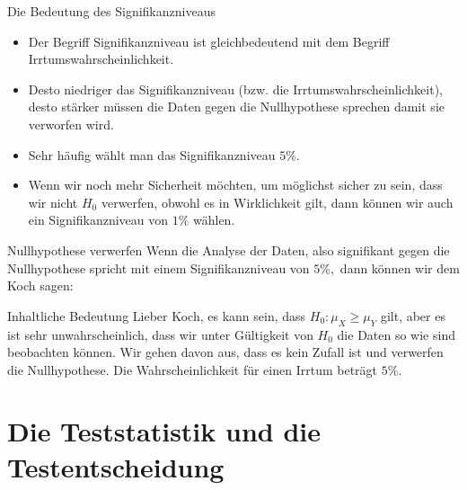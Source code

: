 \documentclass[usenames,dvipsnames,handout]{beamer}
\begin{document}

\begin{frame}{Die Bedeutung des Signifikanzniveaus}
\begin{itemize}
\item{Der Begriff Signifikanzniveau ist gleichbedeutend mit dem Begriff Irrtumswahrscheinlichkeit.}\pause
\item{Desto niedriger das Signifikanzniveau (bzw. die Irrtumswahrscheinlichkeit), desto stärker müssen 
die Daten gegen die Nullhypothese sprechen damit sie verworfen wird.}\pause
\item{Sehr häufig wählt man das Signifikanzniveau $5\%.$}\pause
\item{Wenn wir noch mehr Sicherheit möchten, um möglichst sicher zu sein, dass wir nicht 
$H_{0}$ verwerfen, obwohl es in Wirklichkeit gilt, dann können wir auch ein Signifikanzniveau von $1\%$ wählen.}
\end{itemize}
\end{frame}

\begin{frame}{Nullhypothese verwerfen}
Wenn die Analyse der Daten, also signifikant gegen die Nullhypothese spricht mit einem Signifikanzniveau von 
$5\%,$ dann können wir dem Koch sagen:
\begin{block}{Inhaltliche Bedeutung}
Lieber Koch, es kann sein, dass $H_{0}: \mu_{X} \geq \mu_{Y}$ gilt, aber es ist sehr unwahrscheinlich, dass wir 
unter Gültigkeit von $H_{0}$ die Daten so wie sind beobachten können. Wir gehen davon aus, dass es kein Zufall ist und verwerfen
die Nullhypothese. Die Wahrscheinlichkeit für einen Irrtum beträgt $5\%.$
\end{block}
\end{frame}
\section{Die Teststatistik und die Testentscheidung}
\end{document}
